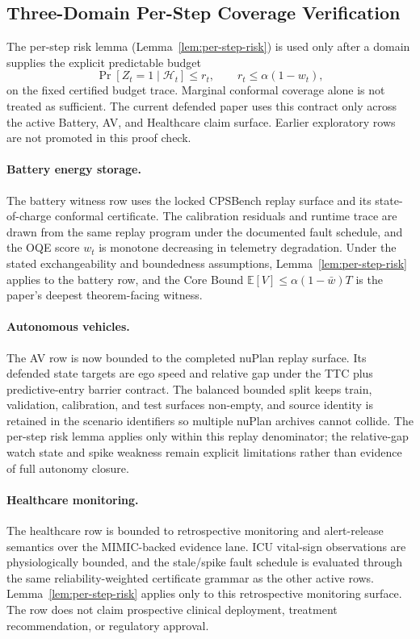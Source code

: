 
\subsection{Three-Domain Per-Step Coverage Verification}

The per-step risk lemma (Lemma~\ref{lem:per-step-risk}) is used only after a
domain supplies the explicit predictable budget
\[
  \Pr[Z_t = 1\mid\mathcal H_t] \le r_t,
  \qquad r_t\le\alpha(1-w_t),
\]
on the fixed certified budget trace.  Marginal conformal coverage alone is not
treated as sufficient.  The current defended paper uses this contract only
across the active Battery, AV, and Healthcare claim surface.  Earlier
exploratory rows are not promoted in this proof check.

\paragraph{Battery energy storage.}
The battery witness row uses the locked CPSBench replay surface and its
state-of-charge conformal certificate.  The calibration residuals and runtime
trace are drawn from the same replay program under the documented fault schedule,
and the OQE score $w_t$ is monotone decreasing in telemetry degradation.  Under
the stated exchangeability and boundedness assumptions, Lemma~\ref{lem:per-step-risk}
applies to the battery row, and the Core Bound
$\mathbb{E}[V] \le \alpha(1 - \bar{w})T$ is the paper's deepest theorem-facing
witness.

\paragraph{Autonomous vehicles.}
The AV row is now bounded to the completed nuPlan replay surface.  Its defended
state targets are ego speed and relative gap under the TTC plus predictive-entry
barrier contract.  The balanced bounded split keeps train, validation,
calibration, and test surfaces non-empty, and source identity is retained in the
scenario identifiers so multiple nuPlan archives cannot collide.  The per-step
risk lemma applies only within this replay denominator; the relative-gap watch
state and spike weakness remain explicit limitations rather than evidence of
full autonomy closure.

\paragraph{Healthcare monitoring.}
The healthcare row is bounded to retrospective monitoring and alert-release
semantics over the MIMIC-backed evidence lane.  ICU vital-sign observations are
physiologically bounded, and the stale/spike fault schedule is evaluated through
the same reliability-weighted certificate grammar as the other active rows.
Lemma~\ref{lem:per-step-risk} applies only to this retrospective monitoring
surface.  The row does not claim prospective clinical deployment, treatment
recommendation, or regulatory approval.


